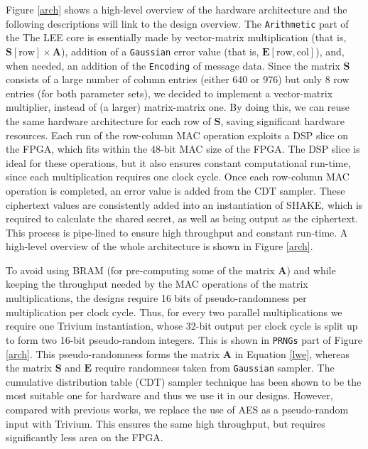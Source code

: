 Figure \ref{arch} shows a high-level overview of the hardware architecture and the following descriptions will link to the design overview. The \texttt{Arithmetic} part of the The LEE core is essentially made by vector-matrix multiplication (that is, $\mathbf{S}[\text{row}]\times \mathbf{A}$), addition of a \texttt{Gaussian} error value (that is, $\mathbf{E}[\text{row},\text{col}]$), and, when needed, an addition of the \texttt{Encoding} of message data. Since the matrix $\mathbf{S}$ consists of a large number of column entries (either 640 or 976) but only 8 row entries (for both parameter sets), we decided to implement a vector-matrix multiplier, instead of (a larger) matrix-matrix one. By doing this, we can reuse the same hardware architecture for each row of $\mathbf{S}$, saving significant hardware resources. Each run of the row-column MAC operation exploits a DSP slice on the FPGA, which fits within the 48-bit MAC size of the FPGA. The DSP slice is ideal for these operations, but it also ensures constant computational run-time, since each multiplication requires one clock cycle. Once each row-column MAC operation is completed, an error value is added from the CDT sampler. These ciphertext values are consistently added into an instantiation of SHAKE, which is required to calculate the shared secret, as well as being output as the ciphertext. This process is pipe-lined to ensure high throughput and constant run-time. A high-level overview of the whole architecture is shown in Figure \ref{arch}.


To avoid using BRAM (for pre-computing some of the matrix $\mathbf{A}$) and while keeping the throughput needed by the MAC operations of the matrix multiplications, the designs require 16 bits of pseudo-randomness per multiplication per clock cycle. Thus, for every two parallel multiplications we require one Trivium instantiation, whose 32-bit output per clock cycle is split up to form two 16-bit pseudo-random integers. This is shown in \texttt{PRNGs} part of Figure \ref{arch}. This pseudo-randomness forms the matrix $\mathbf{A}$ in Equation \ref{lwe}, whereas the matrix $\mathbf{S}$ and $\mathbf{E}$ require randomness taken from \texttt{Gaussian} sampler. The cumulative distribution table (CDT) sampler technique has been shown to be the most suitable one for hardware \cite{howe2018practical} and thus we use it in our designs. However, compared with previous works, we replace the use of AES as a pseudo-random input with Trivium. This ensures the same high throughput, but requires significantly less area on the FPGA.

